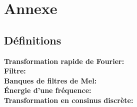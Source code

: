 \documentclass[11pt]{article}
\begin{document}
\section{Annexe}
\subsection{Définitions}
\textbf{Transformation rapide de Fourier:}\label{fft}\\

\textbf{Filtre:}\label{filtre}\\

\textbf{Banques de filtres de Mel:}\label{mfb}\\

\textbf{Énergie d'une fréquence:}\label{freq-energy}\\

\textbf{Transformation en consinus discrète:}\label{dct}
\end{document}
